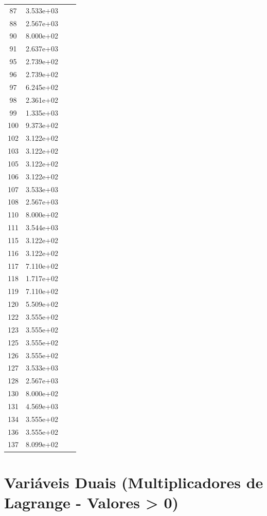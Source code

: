 \documentclass[12pt]{article}
\begin{document}
\begin{longtable}{@{}cccc@{}}
87 & 3.533e+03 &  &  \\
88 & 2.567e+03 &  &  \\
90 & 8.000e+02 &  &  \\
91 & 2.637e+03 &  &  \\
95 & 2.739e+02 &  &  \\
96 & 2.739e+02 &  &  \\
97 & 6.245e+02 &  &  \\
98 & 2.361e+02 &  &  \\
99 & 1.335e+03 &  &  \\
100 & 9.373e+02 &  &  \\
102 & 3.122e+02 &  &  \\
103 & 3.122e+02 &  &  \\
105 & 3.122e+02 &  &  \\
106 & 3.122e+02 &  &  \\
107 & 3.533e+03 &  &  \\
108 & 2.567e+03 &  &  \\
110 & 8.000e+02 &  &  \\
111 & 3.544e+03 &  &  \\
115 & 3.122e+02 &  &  \\
116 & 3.122e+02 &  &  \\
117 & 7.110e+02 &  &  \\
118 & 1.717e+02 &  &  \\
119 & 7.110e+02 &  &  \\
120 & 5.509e+02 &  &  \\
122 & 3.555e+02 &  &  \\
123 & 3.555e+02 &  &  \\
125 & 3.555e+02 &  &  \\
126 & 3.555e+02 &  &  \\
127 & 3.533e+03 &  &  \\
128 & 2.567e+03 &  &  \\
130 & 8.000e+02 &  &  \\
131 & 4.569e+03 &  &  \\
134 & 3.555e+02 &  &  \\
136 & 3.555e+02 &  &  \\
137 & 8.099e+02 &  &  \\

\bottomrule
\end{longtable}


\section{Variáveis Duais (Multiplicadores de Lagrange - Valores > 0)}
\end{document}
